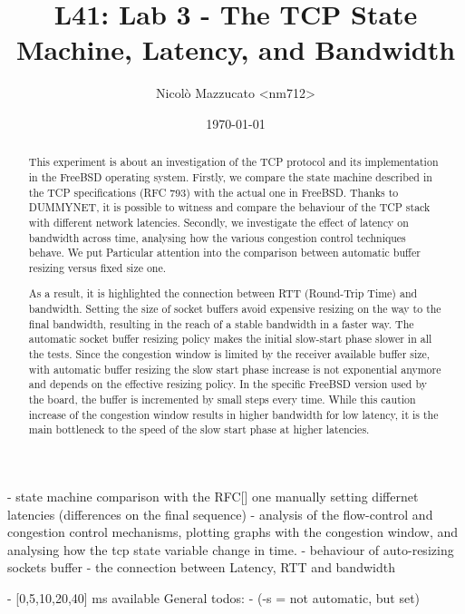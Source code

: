 \documentclass[a4paper,10pt]{article}
\begin{document}
\title{L41: Lab 3 - The TCP State Machine, Latency, and Bandwidth}
\author{Nicolò Mazzucato \textless{}nm712\textgreater{}}
\date{\today}

\maketitle

\thispagestyle{empty}

\begin{abstract}           
   This experiment is about an investigation of the TCP protocol and its implementation in the FreeBSD operating system. Firstly, we compare the state machine described in the TCP specifications (RFC 793\cite{RFC793}) with the actual one in FreeBSD. Thanks to DUMMYNET, it is possible to witness and compare the behaviour of the TCP stack with different network latencies. Secondly, we investigate the effect of latency on bandwidth across time, analysing how the various congestion control techniques behave. We put Particular attention into the comparison between automatic buffer resizing versus fixed size one.

   As a result, it is highlighted the connection between RTT (Round-Trip Time) and bandwidth.  Setting the size of socket buffers avoid expensive resizing on the way to the final bandwidth, resulting in the reach of a stable bandwidth in a faster way. The automatic socket buffer resizing policy makes the initial slow-start phase slower in all the tests. Since the congestion window is limited by the receiver available buffer size, with automatic buffer resizing the slow start phase increase is not exponential anymore and depends on the effective resizing policy. In the specific FreeBSD version used by the board, the buffer is incremented by small steps every time. While this caution increase of the congestion window results in higher bandwidth for low latency, it is the main bottleneck to the speed of the slow start phase at higher latencies.\end{abstract}

\iffalse
- state machine comparison with the RFC[] one manually setting differnet latencies (differences on the final sequence)
   - analysis of the flow-control and congestion control mechanisms, plotting graphs with the congestion window, and analysing how the tcp state variable change in time.
   - behaviour of auto-resizing sockets buffer
   - the connection between Latency, RTT and bandwidth

- [0,5,10,20,40] ms available
General todos:
- (-s = not automatic, but set)
\end{document}
